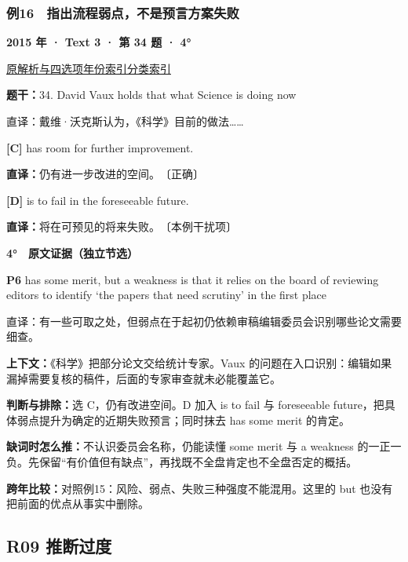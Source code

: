 \documentclass[11pt,a4paper]{article}
\begin{document}
\subsubsection{例16　指出流程弱点，不是预言方案失败}\label{case-2015-T3-Q34}
\noindent\textbf{2015 年 · Text 3 · 第 34 题 · 4°}\par\noindent \href{https://zj139.github.io/math-notes/english/0830618620ce5f72f771a130/\#q34}{原解析与四选项}\quad \hyperref[idx-2015-T3-Q34]{年份索引}\quad \hyperref[class-R08]{分类索引}\par\smallskip
\noindent\textbf{题干：}34. David Vaux holds that what Science is doing now\par
直译：戴维·沃克斯认为，《科学》目前的做法……\par
{}\noindent\textbf{[C]} has room for further improvement.\par\nopagebreak
\noindent\textbf{直译：}仍有进一步改进的空间。　〔正确〕\par
{}\noindent\textbf{[D]} is to fail in the foreseeable future.\par\nopagebreak
\noindent\textbf{直译：}将在可预见的将来失败。　〔本例干扰项〕\par
\begin{evidence}\textbf{4°　原文证据（独立节选）}\par
\textbf{P6} has some merit, but a weakness is that it relies on the board of reviewing editors to identify ‘the papers that need scrutiny’ in the first place\par 直译：有一些可取之处，但弱点在于起初仍依赖审稿编辑委员会识别哪些论文需要细查。\par
\end{evidence}
\noindent\textbf{上下文：}《科学》把部分论文交给统计专家。Vaux 的问题在入口识别：编辑如果漏掉需要复核的稿件，后面的专家审查就未必能覆盖它。\par
\noindent\textbf{判断与排除：}选 C，仍有改进空间。D 加入 is to fail 与 foreseeable future，把具体弱点提升为确定的近期失败预言；同时抹去 has some merit 的肯定。\par
\noindent\textbf{缺词时怎么推：}不认识委员会名称，仍能读懂 some merit 与 a weakness 的一正一负。先保留“有价值但有缺点”，再找既不全盘肯定也不全盘否定的概括。\par
\noindent\textbf{跨年比较：}对照例15：风险、弱点、失败三种强度不能混用。这里的 but 也没有把前面的优点从事实中删除。\par
\clearpage
\subsection{R09 推断过度}
\end{document}
